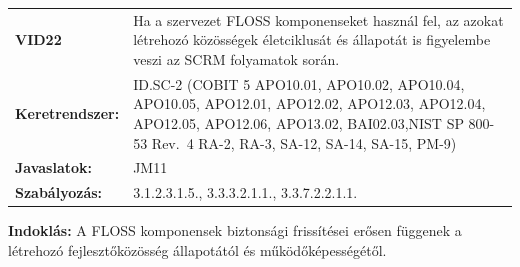 \documentclass[12pt,magyar,a4paper,oneside]{scrreprt}
\begin{document}
\begin{longtable}[]{@{}ll@{}}
\toprule
\endhead
\begin{minipage}[t]{0.16\columnwidth}\raggedright
\textbf{VID22}\strut
\end{minipage} & \begin{minipage}[t]{0.79\columnwidth}\raggedright
Ha a szervezet FLOSS komponenseket használ fel, az azokat létrehozó
közösségek életciklusát és állapotát is figyelembe veszi az SCRM
folyamatok során.\strut
\end{minipage}\tabularnewline
\begin{minipage}[t]{0.16\columnwidth}\raggedright
\textbf{Keretrendszer:}\strut
\end{minipage} & \begin{minipage}[t]{0.79\columnwidth}\raggedright
ID.SC-2 (COBIT 5 APO10.01, APO10.02, APO10.04, APO10.05, APO12.01,
APO12.02, APO12.03, APO12.04, APO12.05, APO12.06, APO13.02,
BAI02.03,NIST SP 800-53 Rev.~4 RA-2, RA-3, SA-12, SA-14, SA-15,
PM-9)\strut
\end{minipage}\tabularnewline
\begin{minipage}[t]{0.16\columnwidth}\raggedright
\textbf{Javaslatok:}\strut
\end{minipage} & \begin{minipage}[t]{0.79\columnwidth}\raggedright
JM11\strut
\end{minipage}\tabularnewline
\begin{minipage}[t]{0.16\columnwidth}\raggedright
\textbf{Szabályozás:}\strut
\end{minipage} & \begin{minipage}[t]{0.79\columnwidth}\raggedright
3.1.2.3.1.5., 3.3.3.2.1.1., 3.3.7.2.2.1.1.\strut
\end{minipage}\tabularnewline
\bottomrule
\end{longtable}

\textbf{Indoklás: } A FLOSS komponensek biztonsági frissítései erősen
függenek a létrehozó fejlesztőközösség állapotától és
működőképességétől.
\end{document}
